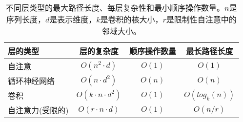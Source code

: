 \begin{table}[t]
\caption{
  不同层类型的最大路径长度、每层复杂性和最小顺序操作数量。$n$是序列长度，$d$是表示维度，$k$是卷积的核大小，$r$是限制性自注意中的邻域大小。}
\label{tab:op_complexities}
\begin{center}
\vspace{-1mm}

\begin{tabular}{lccc}
\toprule
层的类型 & 层的复杂度 & 顺序操作数量 &  最长路径长度  \\
\hline
\rule{0pt}{2.0ex}自注意 & $O(n^2 \cdot d)$ & $O(1)$ & $O(1)$ \\
循环神经网络 & $O(n \cdot d^2)$ & $O(n)$ & $O(n)$ \\

卷积 & $O(k \cdot n \cdot d^2)$ & $O(1)$ & $O(log_k(n))$ \\
自注意力(受限的)& $O(r \cdot n \cdot d)$ & $O(1)$ & $O(n/r)$ \\





\bottomrule
\end{tabular}
\end{center}
\end{table}



